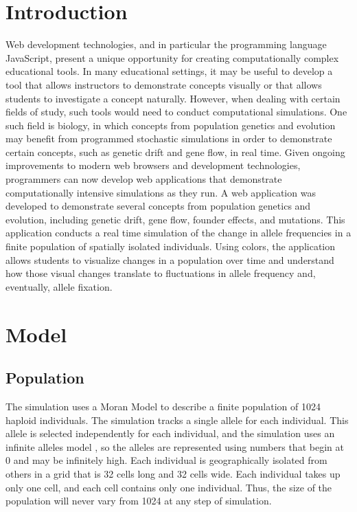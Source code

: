 \documentclass[12pt]{article}
\begin{document}
\begin{spacing}{1.6}
\section{Introduction}

Web development technologies, and in particular the programming language JavaScript, present a unique opportunity for creating computationally complex educational tools. In many educational settings, it may be useful to develop a tool that allows instructors to demonstrate concepts visually or that allows students to investigate a concept naturally. However, when dealing with certain fields of study, such tools would need to conduct computational simulations. One such field is biology, in which concepts from population genetics and evolution may benefit from programmed stochastic simulations in order to demonstrate certain concepts, such as genetic drift and gene flow, in real time. Given ongoing improvements to modern web browsers and development technologies, programmers can now develop web applications that demonstrate computationally intensive simulations as they run. A web application was developed to demonstrate several concepts from population genetics and evolution, including genetic drift, gene flow, founder effects, and mutations. This application conducts a real time simulation of the change in allele frequencies in a finite population of spatially isolated individuals. Using colors, the application allows students to visualize changes in a population over time and understand how those visual changes translate to fluctuations in allele frequency and, eventually, allele fixation.

\section{Model}

\subsection{Population}
The simulation uses a Moran Model \cite{moran} to describe a finite population of 1024 haploid individuals. The simulation tracks a single allele for each individual. This allele is selected independently for each individual, and the simulation uses an infinite alleles model \cite{moran}, so the alleles are represented using numbers that begin at 0 and may be infinitely high. Each individual is geographically isolated from others in a grid that is 32 cells long and 32 cells wide. Each individual takes up only one cell, and each cell contains only one individual. Thus, the size of the population will never vary from 1024 at any step of simulation.


\end{spacing}
\end{document}
